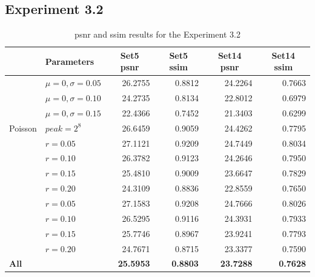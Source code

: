 \subsection{Experiment 3.2}
\begin{table}[]
	\centering
	\begin{tabular}{|l|l|r|r|r|r|}
		\hline
		\rowcolor[HTML]{EFEFEF} 
		\multicolumn{1}{|c|}{\cellcolor[HTML]{EFEFEF}\textbf{Noise}} & \textbf{Parameters} & \multicolumn{1}{c|}{\cellcolor[HTML]{EFEFEF}\textbf{Set5 \gls{psnr}}} & \multicolumn{1}{c|}{\cellcolor[HTML]{EFEFEF}\textbf{Set5 \gls{ssim}}} & \multicolumn{1}{c|}{\cellcolor[HTML]{EFEFEF}\textbf{Set14 \gls{psnr}}} & \multicolumn{1}{c|}{\cellcolor[HTML]{EFEFEF}\textbf{Set14 \gls{ssim}}} \\ \hline
		\rowcolor[HTML]{FFFFFF} 
		\cellcolor[HTML]{EFEFEF} & $\mu=0, \sigma=0.05$ & 26.2755 & 0.8812 & 24.2264 & 0.7663 \\
		\rowcolor[HTML]{EFEFEF} 
		\cellcolor[HTML]{EFEFEF} & $\mu=0, \sigma=0.10$ & 24.2735 & 0.8134 & 22.8012 & 0.6979 \\
		\rowcolor[HTML]{FFFFFF} 
		\multirow{-3}{*}{\cellcolor[HTML]{EFEFEF}Gaussian} & $\mu=0, \sigma=0.15$ & 22.4366 & 0.7452 & 21.3403 & 0.6299 \\
		\rowcolor[HTML]{EFEFEF} 
		Poisson & $peak=2^8$ & 26.6459 & 0.9059 & 24.4262 & 0.7795 \\
		\rowcolor[HTML]{FFFFFF} 
		\cellcolor[HTML]{EFEFEF} & $r=0.05$ & 27.1121 & 0.9209 & 24.7449 & 0.8034 \\
		\rowcolor[HTML]{EFEFEF} 
		\cellcolor[HTML]{EFEFEF} & $r=0.10$ & 26.3782 & 0.9123 & 24.2646 & 0.7950 \\
		\rowcolor[HTML]{FFFFFF} 
		\cellcolor[HTML]{EFEFEF} & $r=0.15$ & 25.4810 & 0.9009 & 23.6647 & 0.7829 \\
		\rowcolor[HTML]{EFEFEF} 
		\multirow{-4}{*}{\cellcolor[HTML]{EFEFEF}Salt-and-pepper} & $r=0.20$ & 24.3109 & 0.8836 & 22.8559 & 0.7650 \\
		\rowcolor[HTML]{FFFFFF} 
		\cellcolor[HTML]{EFEFEF} & $r=0.05$ & 27.1583 & 0.9208 & 24.7666 & 0.8026 \\
		\rowcolor[HTML]{EFEFEF} 
		\cellcolor[HTML]{EFEFEF} & $r=0.10$ & 26.5295 & 0.9116 & 24.3931 & 0.7933 \\
		\rowcolor[HTML]{FFFFFF} 
		\cellcolor[HTML]{EFEFEF} & $r=0.15$ & 25.7746 & 0.8967 & 23.9241 & 0.7793 \\
		\rowcolor[HTML]{EFEFEF} 
		\multirow{-4}{*}{\cellcolor[HTML]{EFEFEF}Uniform} & $r=0.20$ & 24.7671 & 0.8715 & 23.3377 & 0.7590 \\
		\rowcolor[HTML]{FFFFFF} 
		\textbf{All} &  & \textbf{25.5953} & \textbf{0.8803} & \textbf{23.7288} & \textbf{0.7628}\\\hline
	\end{tabular}
	\caption{\gls{psnr} and \gls{ssim} results for the Experiment 3.2}
	\label{tab:experiment32}
\end{table}

